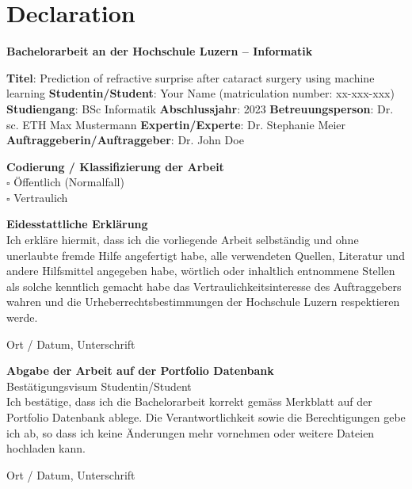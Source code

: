 \chapter*{Declaration}
\textbf{Bachelorarbeit an der Hochschule Luzern – Informatik} \newline

\noindent\textbf{Titel}: Prediction of refractive surprise after cataract surgery using machine learning \newline
\noindent\textbf{Studentin/Student}: Your Name (matriculation number: xx-xxx-xxx) \newline
\noindent\textbf{Studiengang}: BSc Informatik \newline
\noindent\textbf{Abschlussjahr}: 2023 \newline
\noindent\textbf{Betreuungsperson}: Dr. sc. ETH Max Mustermann \newline
\noindent\textbf{Expertin/Experte}: Dr. Stephanie Meier \newline
\noindent\textbf{Auftraggeberin/Auftraggeber}: Dr. John Doe \newline

\noindent\textbf{Codierung / Klassifizierung der Arbeit} \\
$\square$ Öffentlich (Normalfall) \\
$\square$ Vertraulich \newline

\noindent\textbf{Eidesstattliche Erklärung} \\
Ich erkläre hiermit, dass ich die vorliegende Arbeit selbständig und ohne unerlaubte fremde Hilfe angefertigt habe, alle verwendeten Quellen, Literatur und andere Hilfsmittel angegeben habe, wörtlich oder inhaltlich entnommene Stellen als solche kenntlich gemacht habe das Vertraulichkeitsinteresse des Auftraggebers wahren und die Urheberrechtsbestimmungen der Hochschule Luzern respektieren werde. \newline

\noindent Ort / Datum, Unterschrift \newline

\noindent\textbf{Abgabe der Arbeit auf der Portfolio Datenbank} \\
Bestätigungsvisum Studentin/Student \\
Ich bestätige, dass ich die Bachelorarbeit korrekt gemäss Merkblatt auf der Portfolio Datenbank ablege. Die Verantwortlichkeit sowie die Berechtigungen gebe ich ab, so dass ich keine Änderungen mehr vornehmen oder weitere Dateien hochladen kann. \newline

\noindent Ort / Datum, Unterschrift

\newpage 
\thispagestyle{empty}
\ %
\newpage
